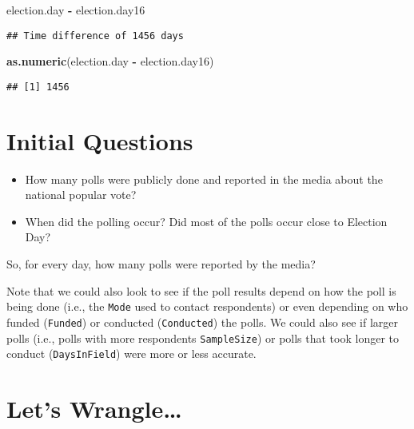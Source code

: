 \documentclass[
]{article}
\newenvironment{Shaded}{\begin{snugshade}}{\end{snugshade}}
\newcommand{\FunctionTok}[1]{\textcolor[rgb]{0.13,0.29,0.53}{\textbf{#1}}}
\newcommand{\NormalTok}[1]{#1}
\newcommand{\SpecialCharTok}[1]{\textcolor[rgb]{0.81,0.36,0.00}{\textbf{#1}}}
\begin{document}
\begin{Shaded}
\begin{Highlighting}[]
\NormalTok{election.day }\SpecialCharTok{{-}}\NormalTok{ election.day16}
\end{Highlighting}
\end{Shaded}

\begin{verbatim}
## Time difference of 1456 days
\end{verbatim}

\begin{Shaded}
\begin{Highlighting}[]
\FunctionTok{as.numeric}\NormalTok{(election.day }\SpecialCharTok{{-}}\NormalTok{ election.day16)}
\end{Highlighting}
\end{Shaded}

\begin{verbatim}
## [1] 1456
\end{verbatim}

\section{Initial Questions}\label{initial-questions}

\begin{itemize}
\item
  How many polls were publicly done and reported in the media about the
  national popular vote?
\item
  When did the polling occur? Did most of the polls occur close to
  Election Day?
\end{itemize}

So, for every day, how many polls were reported by the media?

Note that we could also look to see if the poll results depend on how
the poll is being done (i.e., the \texttt{Mode} used to contact
respondents) or even depending on who funded (\texttt{Funded}) or
conducted (\texttt{Conducted}) the polls. We could also see if larger
polls (i.e., polls with more respondents \texttt{SampleSize}) or polls
that took longer to conduct (\texttt{DaysInField}) were more or less
accurate.

\section{Let's Wrangle\ldots{}}\label{lets-wrangle}
\end{document}
